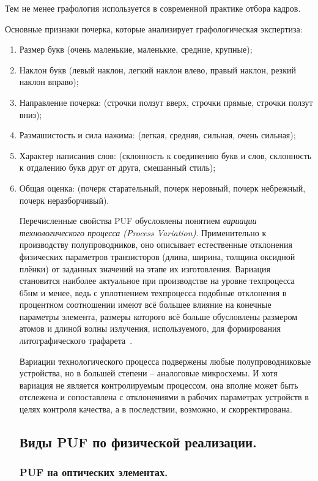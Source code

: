 Тем не менее графология используется в современной практике отбора кадров.

Основные признаки почерка, которые анализирует графологическая экспертиза:
\begin{enumerate}
  \item Размер букв (очень маленькие, маленькие, средние, крупные);
  \item Наклон букв (левый наклон, легкий наклон влево, правый наклон, резкий наклон вправо);
  \item Направление почерка: (строчки ползут вверх, строчки прямые,  строчки ползут вниз);{}
  \item Размашистость и сила нажима: (легкая, средняя, сильная, очень сильная);
  \item Характер написания слов: (склонность к соединению букв и слов, склонность к отдалению букв друг от друга, смешанный стиль);
  \item Общая оценка: (почерк старательный, почерк неровный, почерк небрежный, почерк неразборчивый).

Перечисленные свойства PUF обусловлены понятием \emph{вариации технологического процесса (Process Variation)}. Применительно к производству полупроводников, оно описывает естественные отклонения физических параметров транзисторов (длина, ширина, толщина оксидной плёнки) от заданных значений на этапе их изготовления. Вариация становится наиболее актуальное при производстве на уровне техпроцесса 65нм и менее, ведь с уплотнением техпроцесса подобные отклонения в процентном соотношении имеют всё большее влияние на конечные параметры элемента, размеры которого всё больше обусловлены размером атомов и длиной волны излучения, используемого, для формирования литографического трафарета~\cite{process_variation}.

Вариации технологического процесса подвержены любые полупроводниковые устройства, но в большей степени -- аналоговые микросхемы. И хотя вариация не является контролируемым процессом, она вполне может быть отслежена и сопоставлена с отклонениями в рабочих параметрах устройств в целях контроля качества, а в последствии, возможно, и скорректирована.



\subsection{Виды PUF по физической реализации. }
\label{sub:domain:puf_physical_types}


\subsubsection{PUF на оптических элементах. }
\label{sub:domain:puf_physical_types:optical}


\end{enumerate}

